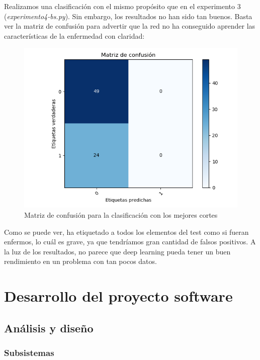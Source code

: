 Realizamos una clasificación con el mismo propósito que en el experimento 3 (\textit{experimento4-bs.py}). Sin embargo, los resultados no han sido tan buenos. Basta ver la matriz de confusión para advertir que la red no ha conseguido aprender las características de la enfermedad con claridad:

\begin{figure}[H] %
	\centering
	\includegraphics[scale=0.65]{conf-deeplearn1.png}  %
	\caption{Matriz de confusión para la clasificación con los mejores cortes} 
	\label{fig:conf-mat-exp4}
\end{figure}

Como se puede ver, ha etiquetado a todos los elementos del test como si fueran enfermos, lo cuál es grave, ya que tendríamos gran cantidad de falsos positivos. A la luz de los resultados, no parece que deep learning pueda tener un buen rendimiento en un problema con tan pocos datos.

\newpage

\section{Desarrollo del proyecto software}

\subsection{Análisis y diseño}

\subsubsection{Subsistemas}

